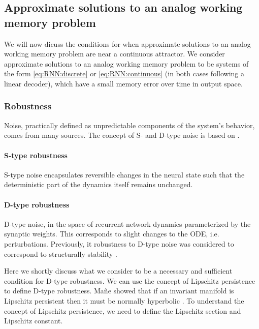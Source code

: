 \documentclass{article} %
\newcounter{ct}
\theoremstyle{definition}
\theoremstyle{remark}
\begin{document}
\subsection{Approximate solutions  to an analog working memory problem}\label{sec:condition_clarifications}
We will now dicuss the conditions for when approximate solutions to an analog working memory problem are near a continuous attractor.
We consider approximate solutions to an analog working memory problem to be systems of the form \ref{eq:RNN:discrete} or \ref{eq:RNN:continuous} (in both cases following a linear decoder), which have a small memory error over time in output space.



\subsubsection{Robustness}
Noise, practically defined as unpredictable components of the system's behavior, comes from many sources.
The concept of S- and D-type noise is based on \citep{Park2023a}.


\paragraph{S-type robustness}\label{sec:stype}
S-type noise encapsulates reversible changes in the neural state such that the deterministic part of the dynamics itself remains unchanged.


\paragraph{D-type robustness}\label{sec:persitencempliesnh}
D-type noise, in the space of recurrent network dynamics parameterized by the synaptic weights.
This corresponds to slight changes to the ODE, i.e. perturbations.
Previously, it robustness to D-type noise was considered to correspond to structurally stability \citep{Park2023a}.

Here we shortly discuss what we consider to be a necessary and sufficient condition for D-type robustness.
We can use the concept of Lipschitz persistence to define D-type robustness.
Ma\~{n}e showed that if an invariant manifold is Lipschitz persistent then it must be normally hyperbolic \citep{mane1978persistent}.
To understand the concept of Lipschitz persistence, we need to define the Lipschitz section and Lipschitz constant.
\end{document}
